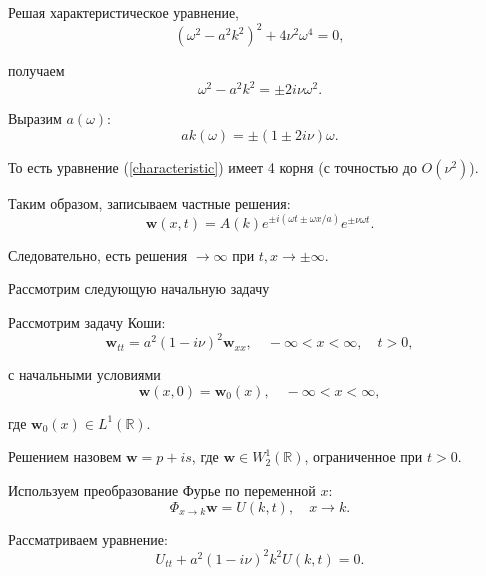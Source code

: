 \documentclass{article}
\begin{document}
Решая характеристическое уравнение,
\begin{equation}
    (\omega^2 - a^2 k^2)^2 + 4 \nu^2 \omega^4 = 0,
    \label{characteristic}
\end{equation}

получаем
\begin{equation*}
    \omega^2 - a^2 k^2 = \pm 2 i \nu \omega^2.
\end{equation*}

Выразим $a(\omega)$:
\begin{equation*}
    ak(\omega) = \pm (1 \pm 2 i \nu) \omega.
\end{equation*}

То есть уравнение (\ref{characteristic}) имеет 4 корня (с точностью до $O(\nu^2)$).

Таким образом, записываем частные решения:
\begin{equation*}
    \mathbf{w}(x,t) = A(k) e^{\pm i(\omega t \pm \omega x/a)} e^{\pm \nu \omega t}.
\end{equation*}

Следовательно, есть решения $\to \infty$ при $t, x \to \pm\infty$.



Рассмотрим следующую начальную задачу

Рассмотрим задачу Коши:
\begin{equation}
    \mathbf{w}_{tt} = a^2 (1 - i \nu)^2 \mathbf{w}_{xx}, \quad -\infty < x < \infty, \quad t > 0,
\end{equation}

с начальными условиями
\begin{equation*}
    \mathbf{w}(x,0) = \mathbf{w}_0(x), \quad -\infty < x < \infty,
\end{equation*}

где $\mathbf{w}_0(x) \in L^1(\mathbb{R})$.

Решением назовем $\mathbf{w} = p + i s$, где $\mathbf{w} \in W^1_2(\mathbb{R})$, ограниченное при $t > 0$.

Используем преобразование Фурье по переменной $x$:
\begin{equation*}
    \Phi_{x \to k} \mathbf{w} = U(k,t), \quad x \to k.
\end{equation*}

Рассматриваем уравнение:
\begin{equation*}
    U_{tt} + a^2 (1 - i\nu)^2 k^2 U(k,t) = 0.
\end{equation*}
\end{document}
